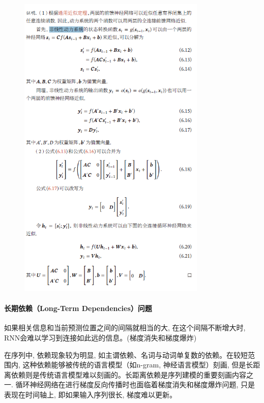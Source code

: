 \documentclass[a4paper]{article}
\begin{document}
\begin{figure}[!htb]
    \center
\includegraphics[width=0.8\textwidth]{RNN_univesal.png}
\end{figure}





 \paragraph{长期依赖（Long-Term Dependencies）问题}
如果相关信息和当前预测位置之间的间隔就相当的大, 在这个间隔不断增大时,  RNN会难以学习到连接如此远的信息。(梯度消失和梯度爆炸)

在序列中, 依赖现象较为明显, 如主谓依赖、名词与动词单复数的依赖。在较短范围内, 这种依赖能够被传统的语言模型（如n-gram, 神经语言模型）刻画, 但是长距离依赖则是传统语言模型难以刻画的。长距离依赖是序列建模的重要刻画内容之一.
循环神经网络在进行梯度反向传播时也面临着梯度消失和梯度爆炸问题, 只是表现在时间轴上, 即如果输入序列很长,  梯度难以更新。
\end{document}
